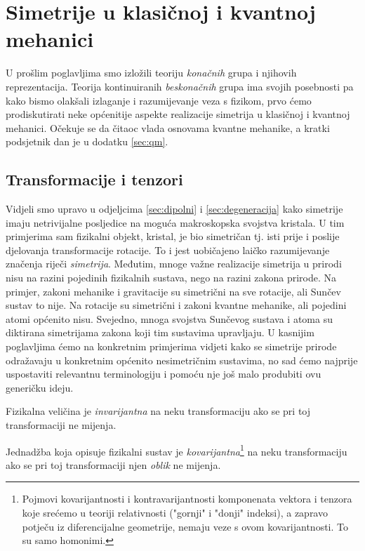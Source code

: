 
\chapter{Simetrije u klasičnoj i kvantnoj mehanici}
\label{ch:klasicna}

U prošlim poglavljima smo izložili teoriju \emph{konačnih} grupa i njihovih reprezentacija.
Teorija kontinuiranih \emph{beskonačnih} grupa ima svojih posebnosti pa kako
bismo olakšali izlaganje i razumijevanje veza s fizikom, prvo ćemo
prodiskutirati neke općenitije aspekte realizacije simetrija u klasičnoj
i kvantnoj mehanici. Očekuje se da čitaoc vlada osnovama kvantne mehanike,
a kratki podsjetnik dan je u dodatku \ref{sec:qm}.


\section{Transformacije i tenzori}
\label{sec:tenzori}

Vidjeli smo upravo u odjeljcima \ref{sec:dipolni} i \ref{sec:degeneracija} kako
simetrije imaju netrivijalne posljedice na moguća makroskopska
svojstva kristala. U tim primjerima sam fizikalni objekt, kristal, je bio
simetričan tj. isti prije i poslije djelovanja transformacije rotacije.
To i jest uobičajeno laičko razumijevanje značenja riječi \emph{simetrija}. Međutim,
mnoge važne realizacije simetrija u prirodi nisu na razini pojedinih
fizikalnih sustava, nego na razini zakona prirode. Na primjer, zakoni mehanike
i gravitacije su simetrični na sve rotacije, ali Sunčev sustav to nije.
Na rotacije su simetrični i zakoni kvantne mehanike, ali pojedini atomi općenito
nisu.
Svejedno, mnoga svojstva Sunčevog sustava i atoma su diktirana simetrijama
zakona koji tim sustavima upravljaju.
U kasnijim poglavljima ćemo na konkretnim primjerima vidjeti kako se simetrije
prirode odražavaju u konkretnim općenito nesimetričnim sustavima, no
sad ćemo najprije uspostaviti relevantnu terminologiju i pomoću nje još
malo produbiti ovu generičku ideju.


\begin{definicija}
Fizikalna veličina je \emph{invarijantna} na neku transformaciju ako se
pri toj transformaciji ne mijenja.

Jednadžba koja opisuje fizikalni sustav je \emph{kovarijantna}\footnote{%
Pojmovi kovarijantnosti i kontravarijantnosti
komponenata vektora i tenzora koje srećemo u teoriji relativnosti
("gornji" i "donji" indeksi), a zapravo potječu iz diferencijalne 
geometrije, nemaju veze s ovom kovarijantnosti.  To su samo homonimi.}
na neku transformaciju ako se pri toj transformaciji 
njen \emph{oblik} ne mijenja.
\end{definicija}


